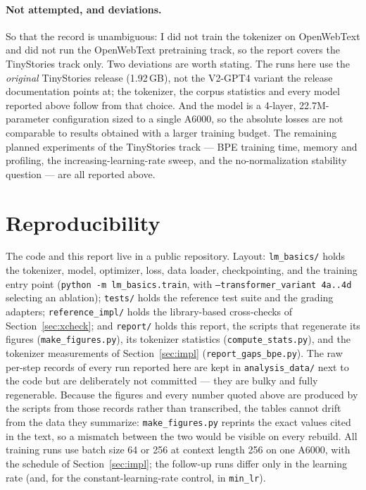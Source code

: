 \documentclass{article}
\begin{document}
\paragraph{Not attempted, and deviations.} So that the record is unambiguous: I did not train the tokenizer on OpenWebText and did not run the OpenWebText pretraining track, so the report covers the TinyStories track only. Two deviations are worth stating. The runs here use the \emph{original} TinyStories release (1.92\,GB), not the V2-GPT4 variant the release documentation points at; the tokenizer, the corpus statistics and every model reported above follow from that choice. And the model is a 4-layer, 22.7M-parameter configuration sized to a single A6000, so the absolute losses are not comparable to results obtained with a larger training budget. The remaining planned experiments of the TinyStories track --- BPE training time, memory and profiling, the increasing-learning-rate sweep, and the no-normalization stability question --- are all reported above.

\section{Reproducibility}

The code and this report live in a public repository. Layout: \texttt{lm\_basics/} holds the tokenizer, model, optimizer, loss, data loader, checkpointing, and the training entry point (\texttt{python -m lm\_basics.train}, with \texttt{--transformer\_variant 4a..4d} selecting an ablation); \texttt{tests/} holds the reference test suite and the grading adapters; \texttt{reference\_impl/} holds the library-based cross-checks of Section~\ref{sec:xcheck}; and \texttt{report/} holds this report, the scripts that regenerate its figures (\texttt{make\_figures.py}), its tokenizer statistics (\texttt{compute\_stats.py}), and the tokenizer measurements of Section~\ref{sec:impl} (\texttt{report\_gaps\_bpe.py}). The raw per-step records of every run reported here are kept in \texttt{analysis\_data/} next to the code but are deliberately not committed --- they are bulky and fully regenerable. Because the figures and every number quoted above are produced by the scripts from those records rather than transcribed, the tables cannot drift from the data they summarize: \texttt{make\_figures.py} reprints the exact values cited in the text, so a mismatch between the two would be visible on every rebuild. All training runs use batch size 64 or 256 at context length 256 on one A6000, with the schedule of Section~\ref{sec:impl}; the follow-up runs differ only in the learning rate (and, for the constant-learning-rate control, in \texttt{min\_lr}).
\end{document}
